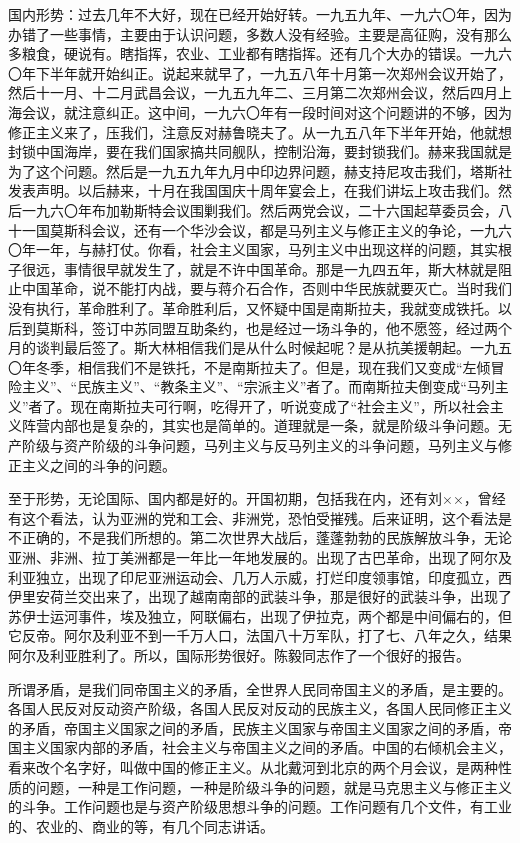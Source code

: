 国内形势：过去几年不大好，现在已经开始好转。一九五九年、一九六〇年，因为办错了一些事情，主要由于认识问题，多数人没有经验。主要是高征购，没有那么多粮食，硬说有。瞎指挥，农业、工业都有瞎指挥。还有几个大办的错误。一九六〇年下半年就开始纠正。说起来就早了，一九五八年十月第一次郑州会议开始了，然后十一月、十二月武昌会议，一九五九年二、三月第二次郑州会议，然后四月上海会议，就注意纠正。这中间，一九六〇年有一段时间对这个问题讲的不够，因为修正主义来了，压我们，注意反对赫鲁晓夫了。从一九五八年下半年开始，他就想封锁中国海岸，要在我们国家搞共同舰队，控制沿海，要封锁我们。赫来我国就是为了这个问题。然后是一九五九年九月中印边界问题，赫支持尼攻击我们，塔斯社发表声明。以后赫来，十月在我国国庆十周年宴会上，在我们讲坛上攻击我们。然后一九六〇年布加勒斯特会议围剿我们。然后两党会议，二十六国起草委员会，八十一国莫斯科会议，还有一个华沙会议，都是马列主义与修正主义的争论，一九六〇年一年，与赫打仗。你看，社会主义国家，马列主义中出现这样的问题，其实根子很远，事情很早就发生了，就是不许中国革命。那是一九四五年，斯大林就是阻止中国革命，说不能打内战，要与蒋介石合作，否则中华民族就要灭亡。当时我们没有执行，革命胜利了。革命胜利后，又怀疑中国是南斯拉夫，我就变成铁托。以后到莫斯科，签订中苏同盟互助条约，也是经过一场斗争的，他不愿签，经过两个月的谈判最后签了。斯大林相信我们是从什么时候起呢？是从抗美援朝起。一九五〇年冬季，相信我们不是铁托，不是南斯拉夫了。但是，现在我们又变成“左倾冒险主义”、“民族主义”、“教条主义”、“宗派主义”者了。而南斯拉夫倒变成“马列主义”者了。现在南斯拉夫可行啊，吃得开了，听说变成了“社会主义”，所以社会主义阵营内部也是复杂的，其实也是简单的。道理就是一条，就是阶级斗争问题。无产阶级与资产阶级的斗争问题，马列主义与反马列主义的斗争问题，马列主义与修正主义之间的斗争的问题。

至于形势，无论国际、国内都是好的。开国初期，包括我在内，还有刘××，曾经有这个看法，认为亚洲的党和工会、非洲党，恐怕受摧残。后来证明，这个看法是不正确的，不是我们所想的。第二次世界大战后，蓬蓬勃勃的民族解放斗争，无论亚洲、非洲、拉丁美洲都是一年比一年地发展的。出现了古巴革命，出现了阿尔及利亚独立，出现了印尼亚洲运动会、几万人示威，打烂印度领事馆，印度孤立，西伊里安荷兰交出来了，出现了越南南部的武装斗争，那是很好的武装斗争，出现了苏伊士运河事件，埃及独立，阿联偏右，出现了伊拉克，两个都是中间偏右的，但它反帝。阿尔及利亚不到一千万人口，法国八十万军队，打了七、八年之久，结果阿尔及利亚胜利了。所以，国际形势很好。陈毅同志作了一个很好的报告。

所谓矛盾，是我们同帝国主义的矛盾，全世界人民同帝国主义的矛盾，是主要的。各国人民反对反动资产阶级，各国人民反对反动的民族主义，各国人民同修正主义的矛盾，帝国主义国家之间的矛盾，民族主义国家与帝国主义国家之间的矛盾，帝国主义国家内部的矛盾，社会主义与帝国主义之间的矛盾。中国的右倾机会主义，看来改个名字好，叫做中国的修正主义。从北戴河到北京的两个月会议，是两种性质的问题，一种是工作问题，一种是阶级斗争的问题，就是马克思主义与修正主义的斗争。工作问题也是与资产阶级思想斗争的问题。工作问题有几个文件，有工业的、农业的、商业的等，有几个同志讲话。

